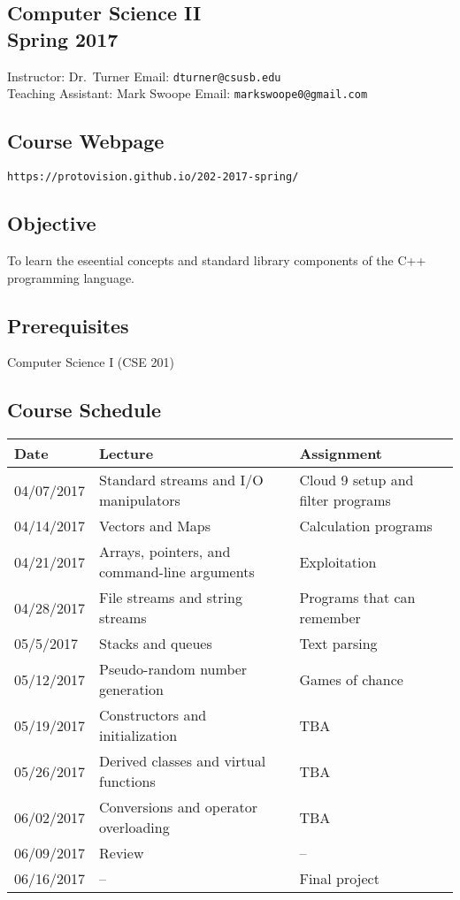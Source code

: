 \documentclass[a4paper,12pt]{article}
\begin{document}
	\begin{center}
		\section*{Computer Science II \\ Spring 2017}
	\end{center}
	Instructor: Dr.~Turner \hfill Email: \verb+dturner@csusb.edu+ \\
	Teaching Assistant: Mark Swoope \hfill Email: \verb+markswoope0@gmail.com+ \\
	\subsection*{Course Webpage}
	\verb+https://protovision.github.io/202-2017-spring/+
	\subsection*{Objective}
	To learn the eseential concepts and standard library components of the C++ programming language.
	\subsection*{Prerequisites}
	Computer Science I (CSE 201)
	\subsection*{Course Schedule}
	\begin{adjustbox}{width=1\textwidth}
	\begin{tabular}{|l|l|l|}
		\hline
		Date & Lecture & Assignment \\
		\hline
		04\slash 07\slash 2017 & Standard streams and I/O manipulators & Cloud 9 setup and filter programs \\
		\hline
		04\slash 14\slash 2017 & Vectors and Maps & Calculation programs \\
		\hline
		04\slash 21\slash 2017 & Arrays, pointers, and command-line arguments & Exploitation \\
		\hline
		04\slash 28\slash 2017 & File streams and string streams & Programs that can remember \\
		\hline
		05\slash 5\slash 2017 & Stacks and queues & Text parsing \\
		\hline
		05\slash 12\slash 2017 & Pseudo-random number generation & Games of chance \\
		\hline
		05\slash 19\slash 2017 & Constructors and initialization & TBA \\
		\hline
		05\slash 26\slash 2017 & Derived classes and virtual functions & TBA \\
		\hline
		06\slash 02\slash 2017 & Conversions and operator overloading & TBA \\
		\hline
		06\slash 09\slash 2017 & Review & -- \\
		\hline
		06\slash 16\slash 2017 & -- & Final project \\
		\hline
	\end{tabular}
	\end{adjustbox}
\end{document}
